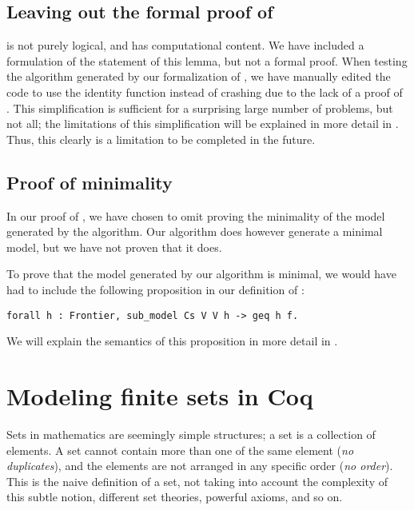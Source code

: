 \subsection{Leaving out the formal proof of }
\label{ssec:leaving_out_the_formal_proof_of_lem_33}

 is not purely logical, and has computational content.
We have included a formulation of the statement of this lemma, but not a formal proof.
When testing the algorithm generated by our formalization of ,
we have manually edited the code to use the identity function instead of crashing due to
the lack of a proof of .
This simplification is sufficient for a surprising large number of problems, but not all;
the limitations of this simplification will be explained in more detail in .
Thus, this clearly is a limitation to be completed in the future.

\subsection{Proof of minimality}
\label{ssec:proof_of_minimality}

In our proof of , we have chosen to omit proving the minimality of the model generated by the algorithm.
Our algorithm does however generate a minimal model, but we have not proven
that it does.

To prove that the model generated by our algorithm is minimal,
we would have had to include the following proposition in our definition of :

\begin{minipage}{\linewidth}
\begin{lstlisting}[language=Coq, label={lst:minimal_model}, caption={Proposition for minimal model}]
forall h : Frontier, sub_model Cs V V h -> geq h f.
\end{lstlisting}
\end{minipage}

We will explain the semantics of this proposition in more detail in .

\section{Modeling finite sets in Coq}
\label{sec:modeling_finite_sets_in_coq}

Sets in mathematics are seemingly simple structures; a set is a collection of elements.
A set cannot contain more than one of the same element (\emph{no duplicates}), and the elements are not arranged in any
specific order (\emph{no order}).
This is the naive definition of a set, not taking into account the complexity of this subtle notion,
different set theories, powerful axioms, and so on.

